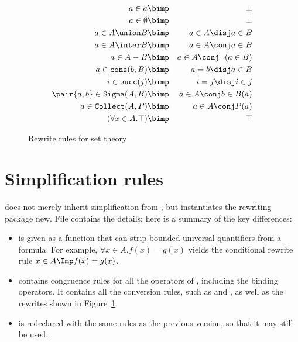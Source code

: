 \begin{figure}
\begin{eqnarray*}
  a\in a 		& \bimp &  \bot\\
  a\in \emptyset 	& \bimp &  \bot\\
  a \in A \union B 	& \bimp &  a\in A \disj a\in B\\
  a \in A \inter B 	& \bimp &  a\in A \conj a\in B\\
  a \in A-B 		& \bimp &  a\in A \conj \neg (a\in B)\\
  a \in {\tt cons}(b,B) & \bimp &  a=b \disj a\in B\\
  i \in {\tt succ}(j) 	& \bimp &  i=j \disj i\in j\\
  \pair{a,b}\in {\tt Sigma}(A,B)
		  	& \bimp &  a\in A \conj b\in B(a)\\
  a \in {\tt Collect}(A,P) 	& \bimp &  a\in A \conj P(a)\\
  (\forall x \in A. \top) 	& \bimp &  \top
\end{eqnarray*}
\caption{Rewrite rules for set theory} \label{ZF-simpdata}
\end{figure}


\section{Simplification rules}
{\ZF} does not merely inherit simplification from \FOL, but instantiates
the rewriting package new.  File  contains the
details; here is a summary of the key differences:
\begin{itemize}
\item 
{} is given as a function that can
strip bounded universal quantifiers from a formula.  For example, $\forall
x\in A.f(x)=g(x)$ yields the conditional rewrite rule $x\in A \Imp
f(x)=g(x)$.
\item
{} contains congruence rules for all the operators of
{\ZF}, including the binding operators.  It contains all the conversion
rules, such as  and , as well as the
rewrites shown in Figure~\ref{ZF-simpdata}.
\item
{} is redeclared with the same {\FOL} rules as the
previous version, so that it may still be used.  
\end{itemize}


